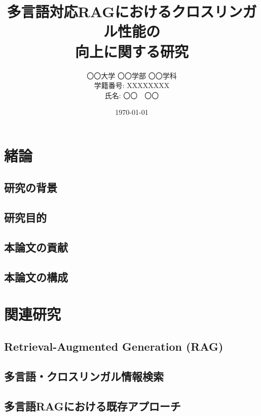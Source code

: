 \documentclass[12pt, a4paper]{jsarticle}
\title{\Huge 多言語対応RAGにおけるクロスリンガル性能の\\向上に関する研究}
\author{〇〇大学 〇〇学部 〇〇学科\\[10pt]
学籍番号: XXXXXXXX\\[5pt]
氏名: 〇〇　〇〇}
\date{\today}
\begin{document}
\maketitle
\thispagestyle{empty}
\newpage

\tableofcontents
\newpage

\chapter{緒論}
\label{chap:introduction}

\section{研究の背景}
\label{sec:background}

\section{研究目的}
\label{sec:purpose}

\section{本論文の貢献}
\label{sec:contribution}

\section{本論文の構成}
\label{sec:structure}

\chapter{関連研究}
\label{chap:related_work}

\section{Retrieval-Augmented Generation (RAG)}
\label{sec:rag_overview}

\section{多言語・クロスリンガル情報検索}
\label{sec:multilingual_ir}

\section{多言語RAGにおける既存アプローチ}
\label{sec:existing_multilingual_rag}
\end{document}

